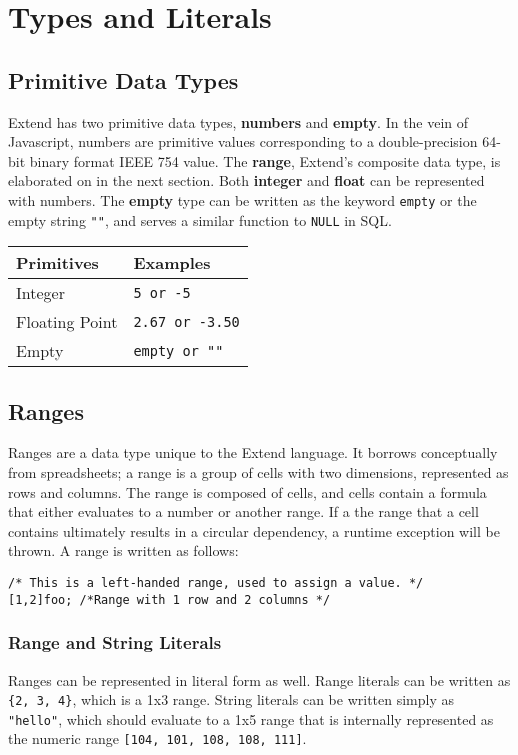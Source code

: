 \section{Types and Literals}
	\subsection{Primitive Data Types}
		Extend has two primitive data types, \textbf{numbers} and \textbf{empty}. In the vein of Javascript, numbers are primitive values corresponding to a double-precision 64-bit binary format IEEE 754 value. The \textbf{range}, Extend's composite data type, is elaborated on in the next section.
		Both \textbf{integer} and \textbf{float} can be represented with numbers. The \textbf{empty} type can be written as the keyword \texttt{empty} or the empty string \texttt{""}, and serves a similar function to \texttt{NULL} in SQL.
		\newline
		\begin{table}[H]
		\centering
		\begin{tabular} {| l | l |}
			\hline
			\textbf{Primitives} & \textbf{Examples} \\ \hline
			Integer & \texttt{5 or -5} \\ \hline
			Floating Point & \texttt{2.67 or -3.50} \\ \hline
			Empty & \texttt{empty or ""} \\ \hline
		\end{tabular}
		\end{table}
	\subsection{Ranges}
		Ranges are a data type unique to the Extend language. It borrows conceptually from spreadsheets; a range is a group of cells with two dimensions, represented as rows and columns. The range is composed of cells, and cells contain a formula that either evaluates to a number or another range. If a the range that a cell contains ultimately results in a circular dependency, a runtime exception will be thrown. A range is written as follows:
		\begin{lstlisting}
/* This is a left-handed range, used to assign a value. */
[1,2]foo; /*Range with 1 row and 2 columns */
		\end{lstlisting}
	\subsubsection{Range and String Literals}
		Ranges can be represented in literal form as well. Range literals can be written as \texttt{\{2, 3, 4\}}, which is a 1x3 range. String literals can be written simply as \texttt{"hello"}, which should evaluate to a 1x5 range that is internally represented as the numeric range \texttt{[104, 101, 108, 108, 111]}.